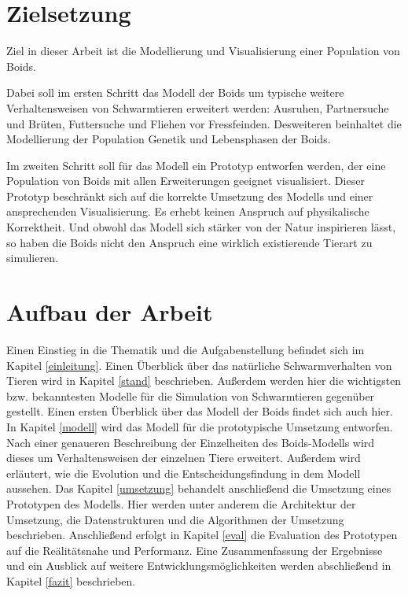 \documentclass[draft=false
              ,paper=a4
              ,twoside=false
              ,fontsize=11pt
              ,headsepline
              ,BCOR10mm
              ,DIV11
              ,bibtotoc
              ,liststotoc
              ]{scrbook}
\begin{document}
\section{Zielsetzung}
Ziel in dieser Arbeit ist die Modellierung und Visualisierung einer Population von Boids.

Dabei soll im ersten Schritt das Modell der Boids um typische weitere Verhaltensweisen von Schwarmtieren erweitert werden: Ausruhen, Partnersuche und Brüten, Futtersuche und Fliehen vor Fressfeinden.
Desweiteren beinhaltet die Modellierung der Population Genetik und Lebensphasen der Boids.

Im zweiten Schritt soll für das Modell ein Prototyp entworfen werden, der eine Population von Boids mit allen Erweiterungen geeignet visualisiert. 
Dieser Prototyp beschränkt sich auf die korrekte Umsetzung des Modells und einer ansprechenden Visualisierung. Es erhebt keinen Anspruch auf physikalische Korrektheit. Und obwohl das Modell sich stärker von der Natur inspirieren lässt, so haben die Boids nicht den Anspruch eine wirklich existierende Tierart zu simulieren.

\section{Aufbau der Arbeit}
Einen Einstieg in die Thematik und die Aufgabenstellung befindet sich im Kapitel \ref{einleitung}.
\newline
Einen Überblick über das natürliche Schwarmverhalten von Tieren wird in Kapitel \ref{stand} beschrieben. Außerdem werden hier die wichtigsten bzw. bekanntesten Modelle für die Simulation von Schwarmtieren gegenüber gestellt. Einen ersten Überblick über das Modell der Boids findet sich auch hier.
\newline
In Kapitel \ref{modell} wird das Modell für die prototypische Umsetzung entworfen. Nach einer genaueren Beschreibung der Einzelheiten des Boids-Modells wird dieses um Verhaltensweisen der einzelnen Tiere erweitert. Außerdem wird erläutert, wie die Evolution und die Entscheidungsfindung in dem Modell aussehen.
\newline
Das Kapitel \ref{umsetzung} behandelt anschließend die Umsetzung eines Prototypen des Modells. Hier werden unter anderem die Architektur der Umsetzung, die Datenstrukturen und die Algorithmen der Umsetzung beschrieben.
\newline
Anschließend erfolgt in Kapitel \ref{eval} die Evaluation des Prototypen auf die Reälitätsnahe und Performanz.
\newline
Eine Zusammenfassung der Ergebnisse und ein Ausblick auf weitere Entwicklungsmöglichkeiten werden abschließend in Kapitel \ref{fazit} beschrieben.
\end{document}
